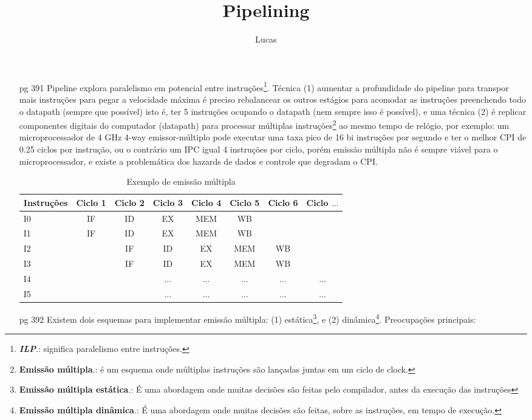 \documentclass{article}
\author{Lucas}
\title{Pipelining}
\begin{document}
\maketitle

\begin{enumerate}

\item[pg 391] Pipeline explora paralelismo em potencial entre
instruções\footnote{\textit{\textbf{ILP}}.: significa paralelismo entre
instruções.}. Técnica (1) aumentar a profundidade do pipeline para transpor mais
instruções para pegar a velocidade máxima é preciso rebalancear os outros
estágios para acomodar as instruções preenchendo todo o datapath (sempre que
possível) isto é, ter 5 instruções ocupando o datapath (nem sempre isso é
possível), e uma técnica (2) é replicar componentes digitais do computador
(datapath) para processar múltiplas instruções\footnote{\textbf{Emissão
múltipla}.: é um esquema onde múltiplas instruções são lançadas juntas em um
ciclo de clock. } ao mesmo tempo de relógio, por exemplo: um microprocessador de
4 GHz 4-way emissor-múltiplo pode executar uma taxa pico de 16 bi instruções por
segundo e ter o melhor CPI de 0.25 ciclos por instrução, ou o contrário um IPC
igual 4 instruções por ciclo, porém emissão múltipla não é sempre viável para o
microprocessador, e existe a problemática dos hazards de dados e controle que
degradam o CPI.

\begin{table}[ht!]
  \centering
  \begin{tabular}{|l|c|c|c|c|c|c|c|}
    \hline Instruções & Ciclo 1 & Ciclo 2 & Ciclo 3 &
                        Ciclo 4 & Ciclo 5 & Ciclo 6 &
                        Ciclo $\ldots$\\
    \hline I0 & IF & ID & EX & MEM & WB & &\\
    \hline I1 & IF & ID & EX & MEM & WB & &\\
    \hline I2 & & IF & ID & EX & MEM & WB &\\
    \hline I3 & & IF & ID & EX & MEM & WB &\\
    \hline I4 & & & $\ldots$ & $\ldots$ & $\ldots$ & $\ldots$ & $\ldots$\\
    \hline I5 & & & $\ldots$ & $\ldots$ & $\ldots$ & $\ldots$ & $\ldots$\\
    \hline
  \end{tabular}
  \caption{Exemplo de emissão múltipla}
\end{table}

\clearpage
\item[pg 392] Existem dois esquemas para implementar emissão múltipla: (1) 
estática\footnote{\textbf{Emissão múltipla estática}.: É uma abordagem onde 
muitas decisões são feitas pelo compilador, antes da execução das instruções}, 
e (2) dinâmica\footnote{\textbf{Emissão múltipla dinâmica}.: É uma abordagem 
onde muitas decisões são feitas, sobre as instruções, em tempo de execução.}.  
Preocupações principais:


\end{enumerate}
\end{document}
